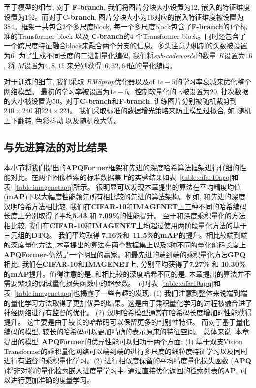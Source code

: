 至于模型的细节, 对于 \textbf{F-branch}, 我们将图片分块大小设置为$12$, 嵌入的特征维度设置为$192$。而对于\textbf{C-branch}, 图片分块大小为$16$对应的嵌入特征维度被设置为$384$。框架一共包含$3$个多尺度block, 每一个多尺度block包含了\textbf{F-branch}的$1$个标准的Transformer block 以及 \textbf{C-branch}的$4$ 个Transformer block。同时还包含了一个跨尺度特征融合block来融合两个分支的信息。多头注意力机制的头数被设置为$6$. 为了生成不同长度的二进制量化编码, 我们将\textit{sub-codewords}的数量 $K$设置为$16$, 将 $M$设置为$4, 8, 16$ 来分别获得$16, 32, 64$位的量化编码。 \par
对于训练的细节, 我们采取 \textit{RMSprop}优化器以及of $1e-5$的学习率衰减来优化整个网络模型。 最初的学习率被设置为$1e-5$。控制软量化的 $\gamma$被设置为$20$, 批次数据的大小被设置为$50$。对于\textbf{C-branch}和\textbf{F-branch}, 训练图片分别被随机裁剪到 $240 \times 240$ 和$224 \times 224$。 我们采取标准的数据增光策略来防止模型过拟合, 如 随机上下翻转, 色彩抖动 以及随机放大等。




\subsection{与先进算法的对比结果}
本小节将我们提出的\textbf{APQFormer}框架和先进的深度哈希算法框架进行仔细的性能对比。在两个图像检索的标准数据集上的实验结果如表~\ref{table:cifar10apq}和表~\ref{table:imagenetapq}所示。 很明显可以发现本章提出的算法在平均精度均值(\textbf{mAP})下以大幅度性能领先所有相比较的先进的算法架构。例如, 和先进的深度汉明哈希方法相比较, 我们在\textbf{CIFAR-10}和\textbf{IMAGENET}上三种不同的哈希编码长度上分别取得了平均\textbf{5.43} 和 \textbf{7.09\%}的性能提升。 至于和深度乘积量化的方法相比较, 我们在\textbf{CIFAR-10}和\textbf{IMAGENET}上均超过使用两阶段量化方法的基于三元组的\textbf{DTQ}。 我们平均取得  \textbf{7.16\%}和~\textbf{11.5\%}的\textbf{mAP}的提升。相比较端到端的深度量化方法, 本章提出的算法在两个数据集上以及3种不同的量化编码长度上-\textbf{APQFormer}-仍然是一个明显的赢家。和最先进的端到端的乘积量化方法\textbf{GPQ}相比, 我们在\textbf{CIFAR-10}和\textbf{IMAGENET}上, 分别平均获得了\textbf{7.27\%} 和 \textbf{10.30\%} 的\textbf{mAP}提升。值得注意的是, 和相比较的深度哈希不同的是, 本章提出的算法并不需要繁琐的调试量化损失函数中的超参数。 同时表~\ref{table:cifar10apq}和表~\ref{table:imagenetapq}也揭露了一些有趣的发现: (1) 我们注意到整体来说端到端的量化学习方法取得了更加优异的结果。这是由于乘积量化学习的过程被融合进了神经网络进行有监督的优化。 (2) 汉明哈希模型通常在哈希码长度增加时性能获得提升。 这主要是由于较长的哈希码可以保留更多的判别性特征。 而对于基于量化编码的模型, 较长的哈希码可以更加精确的表示原来的特征空间。 总体来说, 本章提出的模型~\textbf{APQFormer}的优异性能可以归功于两个方面: (1) 基于双支Vision Transformer的乘积量化网络可以端到端的进行多尺度的细粒度特征学习以及同时进行有监督的乘积量化学习。(2) 进行相似度保留的平均精度量化损失函数 (\textbf{APQ} )将非对称的量化检索嵌入进度量学习中, 通过直接优化返回的检索列表的\textbf{AP}, 可以进行更加准确的度量学习。



